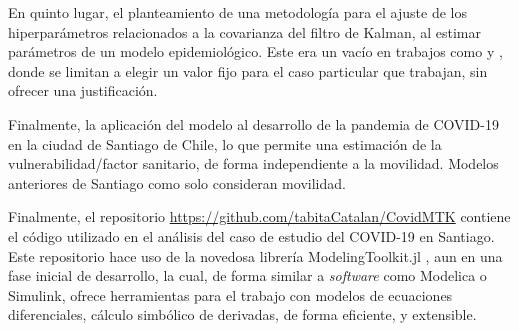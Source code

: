 \begin{conclusion}
En quinto lugar, el planteamiento de una metodología para el ajuste de los hiperparámetros relacionados a la covarianza del filtro de Kalman, al estimar parámetros de un modelo epidemiológico. Este era un vacío en trabajos como \cite{Hasan2020} y \cite{Sameni2020}, donde se limitan a elegir un valor fijo para el caso particular que trabajan, sin ofrecer una justificación.

Finalmente, la aplicación del modelo al desarrollo de la pandemia de COVID-19 en la ciudad de Santiago de Chile, lo que permite una estimación de la vulnerabilidad/factor sanitario, de forma independiente a la movilidad. Modelos anteriores de Santiago como \cite{Gozzi2021} solo consideran movilidad.

Finalmente, el repositorio \url{https://github.com/tabitaCatalan/CovidMTK} contiene el código utilizado en el análisis del caso de estudio del COVID-19 en Santiago. Este repositorio hace uso de la novedosa librería ModelingToolkit.jl \cite{ma2021modelingtoolkit}, aun en una fase inicial de desarrollo, la cual, de forma similar a \textit{software} como Modelica o Simulink, ofrece herramientas para el trabajo con modelos de ecuaciones diferenciales, cálculo simbólico de derivadas, de forma eficiente, y extensible.



\end{conclusion}